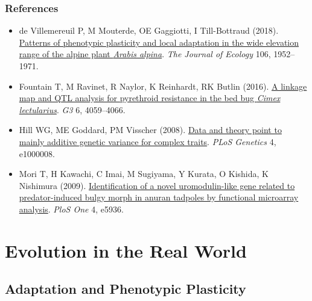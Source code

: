 \documentclass[
]{book}
\providecommand{\tightlist}{%
  \setlength{\itemsep}{0pt}\setlength{\parskip}{0pt}}
\begin{document}
\hypertarget{references-8}{%
\section{References}\label{references-8}}

\begin{itemize}
\tightlist
\item
  de Villemereuil P, M Mouterde, OE Gaggiotti, I Till-Bottraud (2018). \href{https://besjournals.onlinelibrary.wiley.com/doi/10.1111/1365-2745.12955}{Patterns of phenotypic plasticity and local adaptation in the wide elevation range of the alpine plant \emph{Arabis alpina}}. \emph{The Journal of Ecology} 106, 1952--1971.
\item
  Fountain T, M Ravinet, R Naylor, K Reinhardt, RK Butlin (2016). \href{https://www.g3journal.org/content/6/12/4059}{A linkage map and QTL analysis for pyrethroid resistance in the bed bug \emph{Cimex lectularius}}. \emph{G3} 6, 4059--4066.
\item
  Hill WG, ME Goddard, PM Visscher (2008). \href{https://journals.plos.org/plosgenetics/article?id=10.1371/journal.pgen.1000008}{Data and theory point to mainly additive genetic variance for complex traits}. \emph{PLoS Genetics} 4, e1000008.
\item
  Mori T, H Kawachi, C Imai, M Sugiyama, Y Kurata, O Kishida, K Nishimura (2009). \href{https://journals.plos.org/plosone/article?id=10.1371/journal.pone.0005936}{Identification of a novel uromodulin-like gene related to predator-induced bulgy morph in anuran tadpoles by functional microarray analysis}. \emph{PloS One} 4, e5936.
\end{itemize}

\hypertarget{part-evolution-in-the-real-world}{%
\part{Evolution in the Real World}\label{part-evolution-in-the-real-world}}

\hypertarget{adaptation-and-phenotypic-plasticity}{%
\chapter{Adaptation and Phenotypic Plasticity}\label{adaptation-and-phenotypic-plasticity}}
\end{document}
